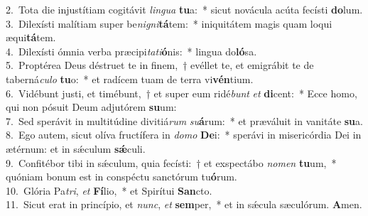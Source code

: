 {2.~}Tota die injustítiam cogitávit \textit{lin}\textit{gua} \textbf{tu}a:~* sicut novácula acúta fecísti \textbf{do}lum.\\
{3.~}Dilexísti malítiam super be\textit{ni}\textit{gni}\textbf{tá}tem:~* iniquitátem magis quam loqui æqui\textbf{tá}tem.\\
{4.~}Dilexísti ómnia verba præcipi\textit{ta}\textit{ti}\textbf{ó}nis:~* lingua do\textbf{ló}sa.\\
{5.~}Proptérea Deus déstruet te in finem,~† evéllet te, et emigrábit te de taberná\textit{cu}\textit{lo} \textbf{tu}o:~* et radícem tuam de terra vi\textbf{vén}tium.\\
{6.~}Vidébunt justi, et timébunt,~† et super eum ridé\textit{bunt} \textit{et} \textbf{di}cent:~* Ecce homo, qui non pósuit Deum adjutórem \textbf{su}um:\\
{7.~}Sed sperávit in multitúdine divitiá\textit{rum} \textit{su}\textbf{á}rum:~* et præváluit in vanitáte \textbf{su}a.\\
{8.~}Ego autem, sicut olíva fructífera in \textit{do}\textit{mo} \textbf{De}i:~* sperávi in misericórdia Dei in ætérnum: et in sǽculum \textbf{sǽ}culi.\\
{9.~}Confitébor tibi in sǽculum, quia fecísti:~† et exspectábo \textit{no}\textit{men} \textbf{tu}um,~* quóniam bonum est in conspéctu sanctórum tu\textbf{ó}rum.\\
{10.~}Glória Pa\textit{tri}, \textit{et} \textbf{Fí}lio,~* et Spirítui \textbf{San}cto.\\
{11.~}Sicut erat in princípio, et \textit{nunc}, \textit{et} \textbf{sem}per,~* et in sǽcula sæculórum. \textbf{A}men.\\
